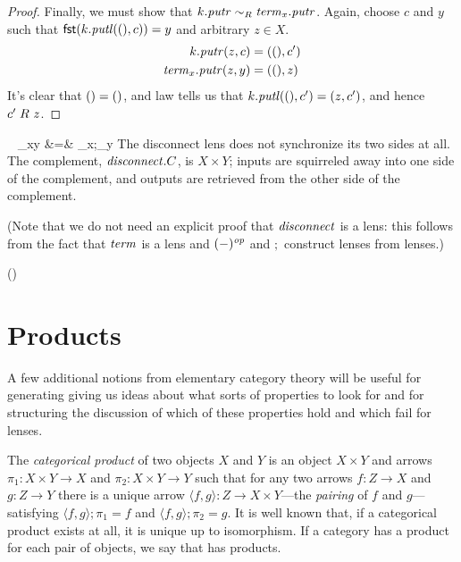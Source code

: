 \begin{defn}[$R$-similarity]
\begin{theorem}
\begin{lemma}
\begin{proof}
Finally, we must show that $k.\mathit{putr} \sim_R \mathit{term}_x.\mathit{putr}$. Again, choose
$c$ and $y$ such that $\mathsf{fst}(k.\mathit{putl}({()},c))=y$ and arbitrary $z \in X$.
\begin{align*}
    k.\mathit{putr}(z,c) &= ({()},c') \\
    \mathit{term}_x.\mathit{putr}(z,y) &= ({()},z)
\end{align*}
It's clear that ${()}={()}$, and law  tells us that
$k.\mathit{putl}({()},c') = (z,c')$, and hence $c' \mathrel{R_{}} z$.
\end{proof}
\fi

\iffull\ifdissertation\else\clearpage\fi\fi

\begin{defn}\ 
{}
{\disconnect_{xy} &=& \const_x;\const_y\op}
The disconnect lens does not synchronize its two sides at all. The
complement, $\mathit{disconnect}.C$, is $X \times Y$; inputs are squirreled away into
one side of the complement, and outputs are retrieved
from the other side of the complement.
\end{defn}

\iffull (Note that we do not need an explicit proof that $\mathit{disconnect}$ is a
lens: this follows from the fact that $\mathit{term}$ is a lens and $(-)^\mathit{op}$ and
$;$ construct lenses from lenses.)  \fi

\iflater
()
\fi

\section{Products}\label{prod}

A few additional notions from elementary category theory will be useful for
\ifdissertation generating \else giving us \fi
ideas about what sorts of properties to look for and for
structuring the discussion of which of these properties hold and which fail
for lenses.

The \emph{categorical product} of two objects $X$ and $Y$ is an object
$X\times Y$ and arrows $\pi_1:X\times Y\rightarrow X$
and $\pi_2:X\times Y\rightarrow Y$ such that for any two arrows $f :
Z\rightarrow X$ and $g:Z\rightarrow Y$ there is a unique arrow
$\langle f,g\rangle:Z\rightarrow X\times Y$---the {\em pairing} of $f$ and
$g$---satisfying $\langle f,g\rangle;\pi_1=f$ and $\langle
f,g\rangle;\pi_2=g$. It is well known that, if a categorical product
exists at all, it is unique up to isomorphism.
%
If a category \catC has a product for each pair of objects, we say that
\catC has products.


\end{lemma}
\end{theorem}
\end{defn}
